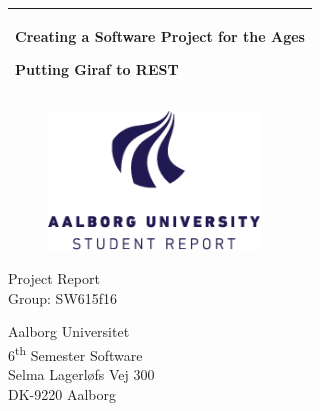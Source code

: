 %
\newcommand{\titlefont}{\sffamily\fontsize{36pt}{0pt}\selectfont}
\newcommand{\subtitlefont}{\sffamily\fontsize{26pt}{0pt}\selectfont}
\newcommand{\otherfont}{\sffamily\fontsize{18pt}{0pt}\selectfont}
\newcommand{\smallfont}{\sffamily\fontsize{12pt}{0pt}\selectfont}
\begin{titlepage}
  \addtolength{\hoffset}{0.5\evensidemargin-0.5\oddsidemargin} %
  \noindent%
  \begin{tabular}{@{}p{\textwidth}@{}}
    \toprule[2pt]
    \midrule
    \vspace{0.2cm}
    \begin{center}
		\titlefont Creating a Software Project for the Ages		
    \end{center}
	\vspace{0.1cm}
    \begin{center}
		\subtitlefont Putting Giraf to REST 
	\end{center}
    \vspace{0.2cm}\\
    \midrule
    \toprule[2pt]
  \end{tabular}
  \vspace{2 cm}
  \begin{figure}[h!]
    \centering
    \includegraphics[width=0.5\textwidth]{img/aau-logo-english.png}
  \end{figure}
  \vspace{3 cm}
  \begin{center}
    \otherfont
      Project Report
    \\
    \vspace{0.2cm}
    \otherfont
      Group: SW615f16
  \end{center}
  \vfill
  \begin{center}
  \smallfont
  Aalborg Universitet\\
  6\textsuperscript{th} Semester Software\\ \vspace{0.1cm}
  Selma Lagerløfs Vej 300\\
  DK-9220 Aalborg
  \end{center}
\end{titlepage}
\clearpage
\cleardoublepage
